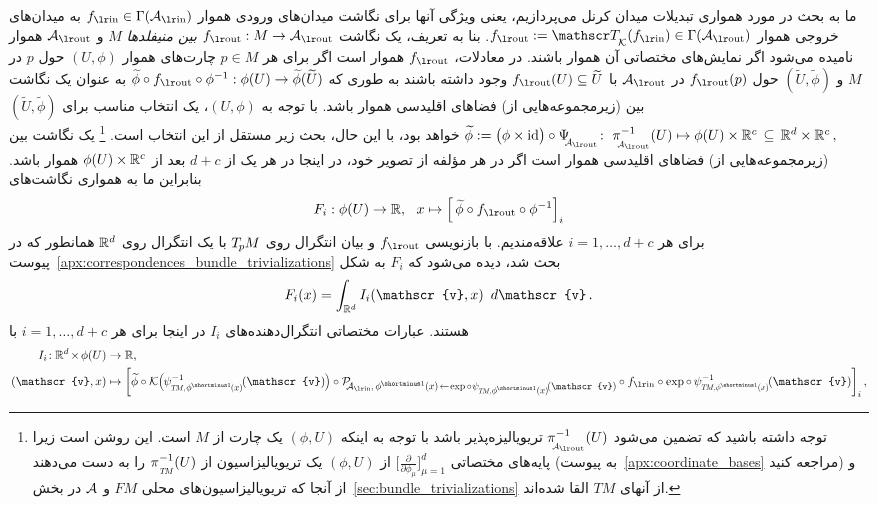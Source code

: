 ما به بحث در مورد همواری تبدیلات میدان کرنل می‌پردازیم، یعنی ویژگی آنها برای نگاشت میدان‌های ورودی هموار $\fin\in\Gamma(\Ain)$ به میدان‌های خروجی هموار $\fout := \TK(\fin) \in \Gamma(\Aout)$.
بنا به تعریف، یک نگاشت $\fout: M\to \Aout$ \emph{بین منیفلدها} $M$ و $\Aout$ هموار نامیده می‌شود اگر نمایش‌های مختصاتی آن هموار باشند.
در معادلات، $\fout$ هموار است اگر برای هر $p\in M$ چارت‌های هموار $(U,\phi)$ حول $p$ در $M$ و $(\widetilde{U}, \widetilde{\phi})$ حول $\fout(p)$ در $\Aout$ با $\fout(U) \subseteq \widetilde{U}$ وجود داشته باشند به طوری که $\widetilde{\phi} \circ \fout \circ \phi^{-1}: \phi(U) \to \widetilde{\phi}(\widetilde{U})$ به عنوان یک نگاشت بین (زیرمجموعه‌هایی از) فضاهای اقلیدسی هموار باشد.
با توجه به $(U,\phi)$، یک انتخاب مناسب برای $(\widetilde{U}, \widetilde{\phi})$
$ \widetilde{\phi} := \big(\phi \times \id\big) \circ \PsiAout\!:\ 
  \piAout^{-1}(U) \mapsto \phi(U) \times \R^c\, \subseteq\, \R^d \times \R^c \,, $
خواهد بود، با این حال، بحث زیر مستقل از این انتخاب است.%
\footnote{
    توجه داشته باشید که تضمین می‌شود $\piAout^{-1}(U)$ تریویالیزه‌پذیر باشد با توجه به اینکه $(\phi,U)$ یک چارت از $M$ است.
    این روشن است زیرا پایه‌های مختصاتی $\big[ \frac{\partial}{\partial \phi_\mu} \big]_{\mu=1}^d$ از $(\phi,U)$ یک تریویالیزاسیون از $\piTM^{-1}(U)$ را به دست می‌دهند (به پیوست~\ref{apx:coordinate_bases} مراجعه کنید) و از آنجا که تریویالیزاسیون‌های محلی $FM$ و $\mathcal{A}$ در بخش~\ref{sec:bundle_trivializations} از آنهای $TM$ القا شده‌اند.
}
یک نگاشت بین (زیرمجموعه‌هایی از) فضاهای اقلیدسی هموار است اگر در هر مؤلفه از تصویر خود، در اینجا در هر یک از $d+c$ بعد از $\phi(U)\times\mathbb{R}^c$ هموار باشد.
بنابراین ما به همواری نگاشت‌های
\begin{align}
    F_i: \phi(U) \to \R,\ \ x \mapsto \Big[\, \widetilde{\phi} \circ \fout \circ \phi^{-1} \Big]_i
\end{align}
برای هر $i = 1,\dots,d+c$ علاقه‌مندیم.
با بازنویسی $\fout$ و بیان انتگرال روی $T_{\mkern-1.5mu p}\mkern-.5muM$ با یک انتگرال روی $\mathbb{R}^d$ همانطور که در پیوست~\ref{apx:correspondences_bundle_trivializations} بحث شد، دیده می‌شود که $F_i$ به شکل
\begin{align}\label{eq:integral_smoothness_component}
    F_i(x) = \int_{\R^d} I_i(\mathscr{v},x)\,\ d\mathscr{v} \,.
\end{align}
هستند. عبارات مختصاتی انتگرال‌دهنده‌های $I_i$ در اینجا برای هر $i = 1,\dots,d+c$ با
\begin{align}\label{eq:integrand_smoothness_full}
    I_i\!: \R^d \mkern-2mu\times\mkern-2mu \phi(U) &\to \R, \\
    (\mathscr{v},x) &\mapsto
    \bigg[ \widetilde{\phi} \circ
    \K\pig(\mkern-1mu \psi_{\protect\scalebox{.65}{$T\!M\mkern-1mu,\mkern2mu$}\protect\scalebox{.75}{$\phi^{\mkern-1mu\shortminus1}\mkern-1mu(x)$}}^{-1} \mkern-2mu(\mathscr{v}) \mkern-1mu\pig) \circ
    \mathcal{P}_{\mkern-4mu\protect\scalebox{.8}{$\!\Ain$},\protect\scalebox{.83}{$\,\phi^{\mkern-1mu\shortminus1}(x)\!\leftarrow\!\exp \circ\mkern1mu \psi_{\protect\scalebox{.7}{$T\!M\mkern-1mu,\mkern1mu$}\protect\scalebox{.9}{$\phi^{\mkern-1mu\shortminus1}(x)$}}\!(\mathscr{v}) $}} \mkern-1mu\circ
    \fin \circ \exp \circ \,
    \psi_{\protect\scalebox{.65}{$T\!M\mkern-1mu,$}\protect\scalebox{.7}{$\phi^{\mkern-1mu\shortminus1}(x)$}}^{-1} \mkern-2mu(\mathscr{v})
    \bigg]_i
    \nonumber \,,
\end{align}
